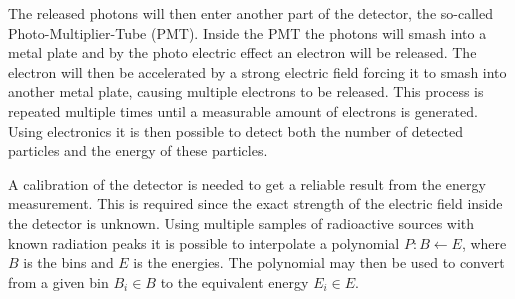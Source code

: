 \documentclass[12pt]{report}
\begin{document}
The released photons will then enter another part of the detector, the so-called Photo-Multiplier-Tube (PMT). Inside the PMT the photons will smash into a metal plate and by the photo electric effect an electron will be released. The electron will then be accelerated by a strong electric field forcing it to smash into another metal plate, causing multiple electrons to be released. This process is repeated multiple times until a measurable amount of electrons is generated. Using electronics it is then possible to detect both the number of detected particles and the energy of these particles.

A calibration of the detector is needed to get a reliable result from the energy measurement. This is required since the exact strength of the electric field inside the detector is unknown. Using multiple samples of radioactive sources with known radiation peaks it is possible to interpolate a polynomial $P : B \leftarrow E$, where $B$ is the bins and $E$ is the energies. The polynomial may then be used to convert from a given bin $B_i \in B$ to the
equivalent energy $E_i \in E$.
\end{document}
